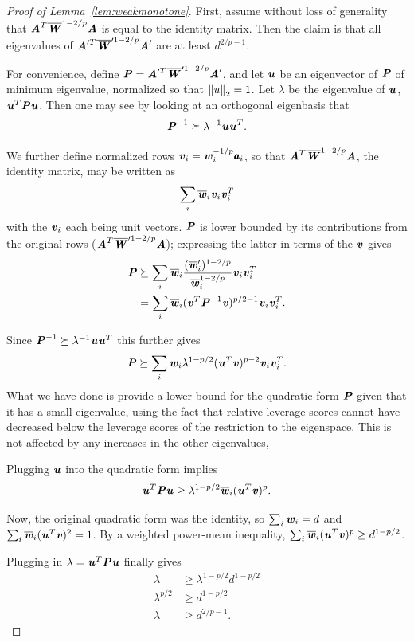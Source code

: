 \begin{proof}[Proof of Lemma~\ref{lem:weakmonotone}]
First, assume without loss of generality that $\AA^T \WWbar^{1 - 2/p} \AA$ is equal to the identity matrix.
Then the claim is that all eigenvalues of $\AA'^T \WWbar'^{1 - 2/p} \AA'$ are at least $d^{2/p - 1}$.

For convenience, define $\PP = \AA'^T \WWbar'^{1 - 2/p} \AA'$, and let $\uu$ be an eigenvector of
$\PP$ of minimum eigenvalue, normalized so that $\norm{u}_2 = 1$.  Let $\lambda$ be the eigenvalue
of $\uu$, $\uu^T \PP \uu$.  Then one may see by looking at an orthogonal eigenbasis that
\begin{equation*}
\PP^{-1} \succeq \lambda^{-1} \uu \uu^T.
\end{equation*}

We further define normalized rows $\vv_i = \ww_i^{-1/p} \aa_i$, so that $\AA^T \WWbar^{1 - 2/p} \AA$,
the identity matrix, may be written as
\begin{equation*}
\sum_i \wwbar_i \vv_i \vv_i^T
\end{equation*}
with the $\vv_i$ each being unit vectors.  $\PP$ is lower bounded by its contributions from the original rows
($\AA^T \WWbar'^{1-2/p} \AA$); expressing the latter in terms of the $\vv$ gives
\begin{align*}
\PP &\succeq \sum_i \wwbar_i \frac{(\wwbar'_i)^{1-2/p}}{\wwbar_i^{1-2/p}} \vv_i \vv_i^T \\
&= \sum_i \wwbar_i (\vv^T \PP^{-1} \vv)^{p/2-1} \vv_i \vv_i^T.
\end{align*}

Since $\PP^{-1} \succeq \lambda^{-1} \uu \uu^T$ this further gives
\begin{equation*}
\PP \succeq \sum_i \ww_i \lambda^{1-p/2} (\uu^T \vv)^{p-2} \vv_i \vv_i^T.
\end{equation*}
What we have done is provide a lower bound for the quadratic form $\PP$ given that it has
a small eigenvalue, using the fact that relative leverage scores cannot have decreased
below the leverage scores of the restriction to the eigenspace.  This is not affected by
any increases in the other eigenvalues,

Plugging $\uu$ into the quadratic form implies
\begin{equation*}
\uu^T \PP \uu \geq \lambda^{1-p/2} \wwbar_i (\uu^T \vv)^p.
\end{equation*}

Now, the original quadratic form was the identity, so $\sum_i \ww_i = d$ and $\sum_i \wwbar_i (\uu^T \vv)^2 = 1$.
By a weighted power-mean inequality, $\sum_i \wwbar_i (\uu^T \vv)^p \geq d^{1-p/2}$.

Plugging in $\lambda = \uu^T \PP \uu$ finally gives
\begin{align*}
\lambda &\geq \lambda^{1-p/2} d^{1-p/2} \\
\lambda^{p/2} &\geq d^{1-p/2} \\
\lambda &\geq d^{2/p - 1}.
\end{align*}
\end{proof}

